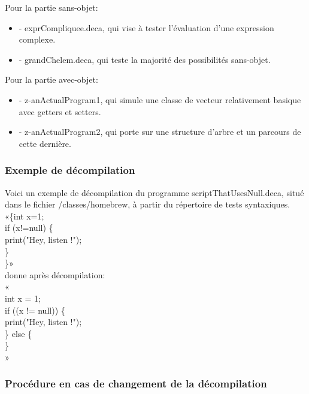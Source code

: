 \documentclass[a4paper]{article}
\begin{document}
Pour la partie sans-objet:\\
\begin{itemize}
\item- exprCompliquee.deca, qui vise à tester l'évaluation d'une expression complexe.\\
\item- grandChelem.deca, qui teste la majorité des possibilités sans-objet.\\
\end{itemize}
Pour la partie avec-objet:\\

\begin{itemize}
\item- z-anActualProgram1, qui simule une classe de vecteur relativement basique avec getters et setters.\\
\item- z-anActualProgram2, qui porte sur une structure d'arbre et un parcours de cette dernière.\\
\end{itemize}

\subsubsection{Exemple de décompilation}

Voici un exemple de décompilation du programme scriptThatUsesNull.deca, situé dans le fichier /classes/homebrew, à partir du répertoire de tests syntaxiques.\\

\noindent «\{int x=1;\\
if (x!=null) \{\\
\indent    print("Hey, listen !");\\
\}\\
\}»\\
donne après décompilation:\\
«{\\
\indent	int x = 1;\\
\indent	if ((x != null)) \{\\
\indent \indent		print("Hey, listen !");\\
\indent	\} else \{\\
\indent \} \\
}»\\

\subsubsection{Procédure en cas de changement de la décompilation}
\end{document}

